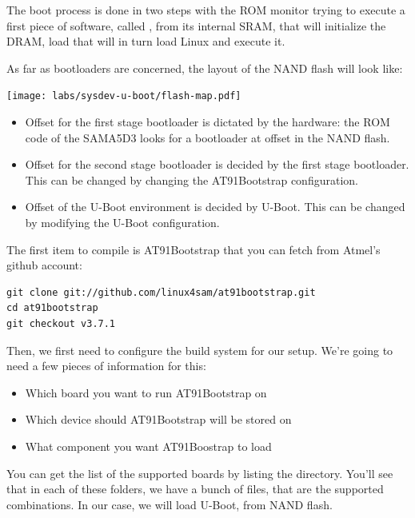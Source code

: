 The boot process is done in two steps with the ROM monitor trying to
execute a first piece of software, called , from
its internal SRAM, that will initialize the DRAM, load 
that will in turn load Linux and execute it.

As far as bootloaders are concerned, the layout of the NAND flash will
look like:

\begin{center}
  \texttt{[image: labs/sysdev-u-boot/flash-map.pdf]}
\end{center}

\begin{itemize}
\item Offset  for the first stage bootloader is dictated by
  the hardware: the ROM code of the SAMA5D3 looks for a bootloader at
  offset  in the NAND flash.
\item Offset  for the second stage bootloader is decided
  by the first stage bootloader. This can be changed by changing the
  AT91Bootstrap configuration.
\item Offset  of the U-Boot environment is decided by
  U-Boot. This can be changed by modifying the U-Boot configuration.
\end{itemize}

The first item to compile is AT91Bootstrap that you can fetch from
Atmel's github account:

\begin{verbatim}
git clone git://github.com/linux4sam/at91bootstrap.git
cd at91bootstrap
git checkout v3.7.1
\end{verbatim}

Then, we first need to configure the build system for our setup. We're
going to need a few pieces of information for this:

\begin{itemize}
\item Which board you want to run AT91Bootstrap on
\item Which device should AT91Bootstrap will be stored on
\item What component you want AT91Boostrap to load
\end{itemize}

You can get the list of the supported boards by listing the
 directory. You'll see that in each of these folders, we
have a bunch of  files, that are the supported
combinations. In our case, we will load U-Boot, from NAND flash.

